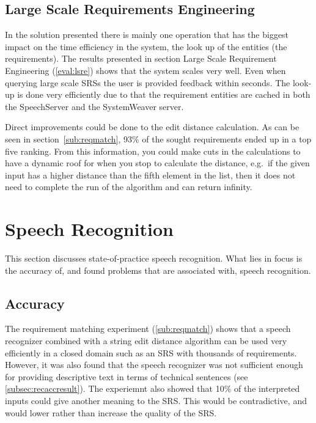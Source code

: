 \subsection{Large Scale Requirements Engineering}
In the solution presented there is mainly one operation that has the biggest impact on the time efficiency in the system, the look up of the entities (the requirements). The results presented in section Large Scale Requirement Engineering (\ref{eval:lsre}) shows that the system scales very well. Even when querying large scale SRSs the user is provided feedback within seconds. The look-up is done very efficiently due to that the requirement entities are cached in both the SpeechServer and the SystemWeaver server. 

Direct improvements could be done to the edit distance calculation. As can be seen in section~\ref{sub:reqmatch}, 93\% of the sought requirements ended up in a top five ranking. From this information, you could make cuts in the calculations to have a dynamic roof for when you stop to calculate the distance, e.g.\ if the given input has a higher distance than the fifth element in the list, then it does not need to complete the run of the algorithm and can return infinity. 

\section{Speech Recognition}
This section discusses state-of-practice speech recognition. What lies in focus is the accuracy of, and found problems that are associated with, speech recognition. 
\subsection{Accuracy}
The requirement matching experiment (\ref{sub:reqmatch}) shows that a speech recognizer combined with a string edit distance algorithm can be used very efficiently in a closed domain such as an SRS with thousands of requirements. However, it was also found that the speech recognizer was not sufficient enough for providing descriptive text in terms of technical sentences (see \ref{subsec:recaccresult}). The experiemnt also showed that 10\% of the interpreted inputs could give another meaning to the SRS. This would be contradictive, and would lower rather than increase the quality of the SRS. 

